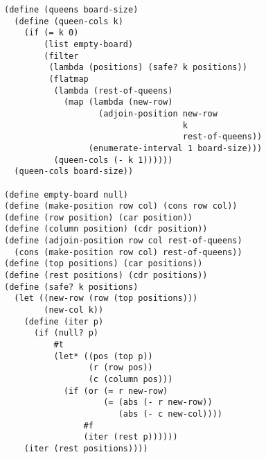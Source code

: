 \documentclass[a4paper,12pt]{article}
\begin{document}
\begin{lstlisting}
(define (queens board-size)
  (define (queen-cols k)
    (if (= k 0)
        (list empty-board)
        (filter
         (lambda (positions) (safe? k positions))
         (flatmap
          (lambda (rest-of-queens)
            (map (lambda (new-row)
                   (adjoin-position new-row
                                    k
                                    rest-of-queens))
                 (enumerate-interval 1 board-size)))
          (queen-cols (- k 1))))))
  (queen-cols board-size))

(define empty-board null)
(define (make-position row col) (cons row col))
(define (row position) (car position))
(define (column position) (cdr position))
(define (adjoin-position row col rest-of-queens)
  (cons (make-position row col) rest-of-queens))
(define (top positions) (car positions))
(define (rest positions) (cdr positions))
(define (safe? k positions)
  (let ((new-row (row (top positions)))
        (new-col k))
    (define (iter p)
      (if (null? p)
          #t
          (let* ((pos (top p))
                 (r (row pos))
                 (c (column pos)))
            (if (or (= r new-row)
                    (= (abs (- r new-row))
                       (abs (- c new-col))))
                #f
                (iter (rest p))))))
    (iter (rest positions))))
\end{lstlisting}
\end{document}
